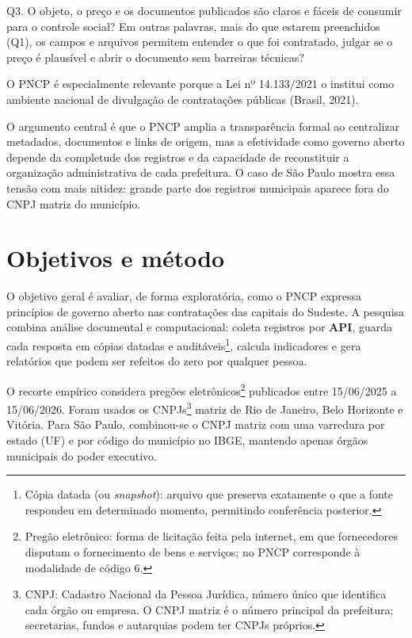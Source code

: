 \documentclass[12pt]{article}
\begin{document}
Q3. O objeto, o preço e os documentos publicados são claros e fáceis de
consumir para o controle social? Em outras palavras, mais do que estarem
preenchidos (Q1), os campos e arquivos permitem entender o que foi
contratado, julgar se o preço é plausível e abrir o documento sem
barreiras técnicas?

O PNCP é especialmente relevante porque a Lei nº 14.133/2021 o institui
como ambiente nacional de divulgação de contratações públicas (Brasil,
2021).

O argumento central é que o PNCP amplia a transparência formal ao
centralizar metadados, documentos e links de origem, mas a efetividade
como governo aberto depende da completude dos registros e da capacidade
de reconstituir a organização administrativa de cada prefeitura. O caso
de São Paulo mostra essa tensão com mais nitidez: grande parte dos
registros municipais aparece fora do CNPJ matriz do município.

\section{Objetivos e método}\label{objetivos-e-muxe9todo}

O objetivo geral é avaliar, de forma exploratória, como o PNCP expressa
princípios de governo aberto nas contratações das capitais do Sudeste. A
pesquisa combina análise documental e computacional: coleta registros
por \textbf{API}, guarda cada resposta em cópias datadas e
auditáveis\footnote{Cópia datada (ou \emph{snapshot}): arquivo que
  preserva exatamente o que a fonte respondeu em determinado momento,
  permitindo conferência posterior.}, calcula indicadores e gera
relatórios que podem ser refeitos do zero por qualquer pessoa.

O recorte empírico considera pregões eletrônicos\footnote{Pregão
  eletrônico: forma de licitação feita pela internet, em que
  fornecedores disputam o fornecimento de bens e serviços; no PNCP
  corresponde à modalidade de código 6.} publicados entre 15/06/2025 a
15/06/2026. Foram usados os CNPJs\footnote{CNPJ: Cadastro Nacional da
  Pessoa Jurídica, número único que identifica cada órgão ou empresa. O
  CNPJ matriz é o número principal da prefeitura; secretarias, fundos e
  autarquias podem ter CNPJs próprios.} matriz de Rio de Janeiro, Belo
Horizonte e Vitória. Para São Paulo, combinou-se o CNPJ matriz com uma
varredura por estado (UF) e por código do município no IBGE, mantendo
apenas órgãos municipais do poder executivo.
\end{document}
